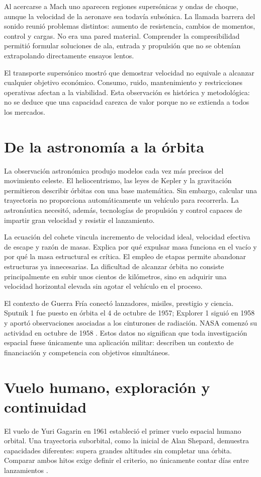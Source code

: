 Al acercarse a Mach uno aparecen regiones supersónicas y ondas de choque, aunque la velocidad de la aeronave sea todavía subsónica. La llamada barrera del sonido reunió problemas distintos: aumento de resistencia, cambios de momentos, control y cargas. No era una pared material. Comprender la compresibilidad permitió formular soluciones de ala, entrada y propulsión que no se obtenían extrapolando directamente ensayos lentos.

El transporte supersónico mostró que demostrar velocidad no equivale a alcanzar cualquier objetivo económico. Consumo, ruido, mantenimiento y restricciones operativas afectan a la viabilidad. Esta observación es histórica y metodológica: no se deduce que una capacidad carezca de valor porque no se extienda a todos los mercados.

\section{De la astronomía a la órbita}
La observación astronómica produjo modelos cada vez más precisos del movimiento celeste. El heliocentrismo, las leyes de Kepler y la gravitación permitieron describir órbitas con una base matemática. Sin embargo, calcular una trayectoria no proporciona automáticamente un vehículo para recorrerla. La astronáutica necesitó, además, tecnologías de propulsión y control capaces de impartir gran velocidad y resistir el lanzamiento.

La ecuación del cohete vincula incremento de velocidad ideal, velocidad efectiva de escape y razón de masas. Explica por qué expulsar masa funciona en el vacío y por qué la masa estructural es crítica. El empleo de etapas permite abandonar estructuras ya innecesarias. La dificultad de alcanzar órbita no consiste principalmente en subir unos cientos de kilómetros, sino en adquirir una velocidad horizontal elevada sin agotar el vehículo en el proceso.

El contexto de Guerra Fría conectó lanzadores, misiles, prestigio y ciencia. Sputnik 1 fue puesto en órbita el 4 de octubre de 1957; Explorer 1 siguió en 1958 y aportó observaciones asociadas a los cinturones de radiación. NASA comenzó su actividad en octubre de 1958 \cite{NASA-HISTORY}. Estos datos no significan que toda investigación espacial fuese únicamente una aplicación militar: describen un contexto de financiación y competencia con objetivos simultáneos.

\section{Vuelo humano, exploración y continuidad}
El vuelo de Yuri Gagarin en 1961 estableció el primer vuelo espacial humano orbital. Una trayectoria suborbital, como la inicial de Alan Shepard, demuestra capacidades diferentes: supera grandes altitudes sin completar una órbita. Comparar ambos hitos exige definir el criterio, no únicamente contar días entre lanzamientos \cite{TAE1}.

